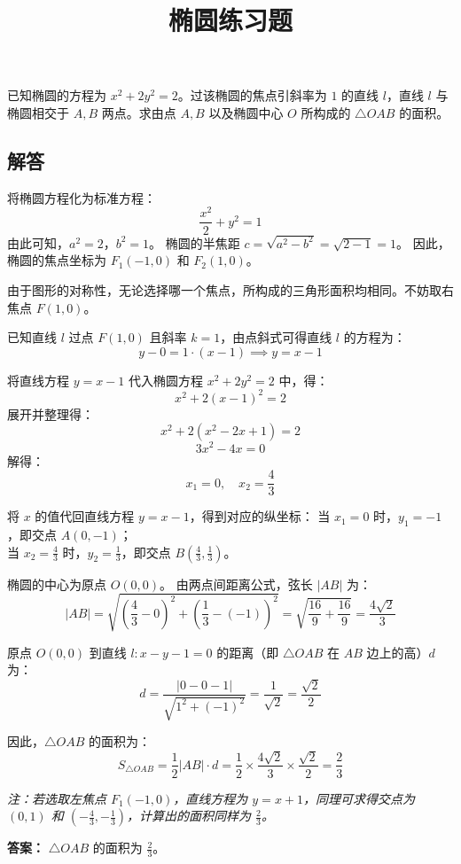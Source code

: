 \documentclass[12pt]{exam}
\title{\vspace{-2cm}椭圆练习题\vspace{-1cm}}
\author{}
\date{}
\begin{document}
\maketitle
\vspace{-1.5cm}

\begin{questions}
\question 已知椭圆的方程为 $x^2 + 2y^2 = 2$。过该椭圆的焦点引斜率为 $1$ 的直线 $l$，直线 $l$ 与椭圆相交于 $A, B$ 两点。求由点 $A, B$ 以及椭圆中心 $O$ 所构成的 $\triangle OAB$ 的面积。

\end{questions}

\begin{answer}
\section*{解答}
将椭圆方程化为标准方程：
\[ \frac{x^2}{2} + y^2 = 1 \]
由此可知，$a^2 = 2$，$b^2 = 1$。
椭圆的半焦距 $c = \sqrt{a^2 - b^2} = \sqrt{2 - 1} = 1$。
因此，椭圆的焦点坐标为 $F_1(-1, 0)$ 和 $F_2(1, 0)$。

由于图形的对称性，无论选择哪一个焦点，所构成的三角形面积均相同。不妨取右焦点 $F(1, 0)$。

已知直线 $l$ 过点 $F(1, 0)$ 且斜率 $k = 1$，由点斜式可得直线 $l$ 的方程为：
\[ y - 0 = 1 \cdot (x - 1) \implies y = x - 1 \]

将直线方程 $y = x - 1$ 代入椭圆方程 $x^2 + 2y^2 = 2$ 中，得：
\[ x^2 + 2(x - 1)^2 = 2 \]
展开并整理得：
\[ x^2 + 2(x^2 - 2x + 1) = 2 \]
\[ 3x^2 - 4x = 0 \]
解得：
\[ x_1 = 0, \quad x_2 = \frac{4}{3} \]

将 $x$ 的值代回直线方程 $y = x - 1$，得到对应的纵坐标：
当 $x_1 = 0$ 时，$y_1 = -1$，即交点 $A(0, -1)$；\\
当 $x_2 = \frac{4}{3}$ 时，$y_2 = \frac{1}{3}$，即交点 $B\left(\frac{4}{3}, \frac{1}{3}\right)$。

椭圆的中心为原点 $O(0, 0)$。
由两点间距离公式，弦长 $|AB|$ 为：
\[ |AB| = \sqrt{\left(\frac{4}{3} - 0\right)^2 + \left(\frac{1}{3} - (-1)\right)^2} = \sqrt{\frac{16}{9} + \frac{16}{9}} = \frac{4\sqrt{2}}{3} \]

原点 $O(0, 0)$ 到直线 $l: x - y - 1 = 0$ 的距离（即 $\triangle OAB$ 在 $AB$ 边上的高）$d$ 为：
\[ d = \frac{|0 - 0 - 1|}{\sqrt{1^2 + (-1)^2}} = \frac{1}{\sqrt{2}} = \frac{\sqrt{2}}{2} \]

因此，$\triangle OAB$ 的面积为：
\[ S_{\triangle OAB} = \frac{1}{2} |AB| \cdot d = \frac{1}{2} \times \frac{4\sqrt{2}}{3} \times \frac{\sqrt{2}}{2} = \frac{2}{3} \]

\textit{注：若选取左焦点 $F_1(-1, 0)$，直线方程为 $y = x + 1$，同理可求得交点为 $(0, 1)$ 和 $\left(-\frac{4}{3}, -\frac{1}{3}\right)$，计算出的面积同样为 $\frac{2}{3}$。}

\vspace{0.5cm}
\textbf{答案：} $\triangle OAB$ 的面积为 $\frac{2}{3}$。

\end{answer}
\end{document}
